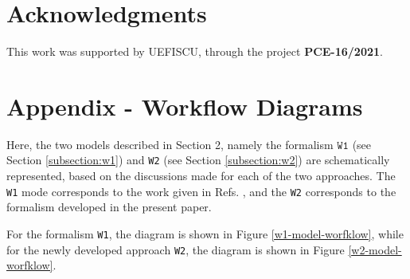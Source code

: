 \documentclass[11pt]{article}
\begin{document}
\section*{Acknowledgments}
This work was supported by UEFISCU, through the project \textbf{PCE-16/2021}.

\appendix
\section{Appendix - Workflow Diagrams}
Here, the two models described in Section 2, namely the formalism $\texttt{W1}$ (see Section \ref{subsection:w1}) and \texttt{W2} (see Section \ref{subsection:w2}) are schematically represented, based on the discussions made for each of the two approaches. The \texttt{W1} mode corresponds to the work given in Refs. \cite{raduta2020approach,raduta2020towards}, and the \texttt{W2} corresponds to the formalism developed in the present paper. 

For the formalism \texttt{W1}, the diagram is shown in Figure \ref{w1-model-worfklow}, while for the newly developed approach \texttt{W2}, the diagram is shown in Figure \ref{w2-model-worfklow}.
\end{document}
